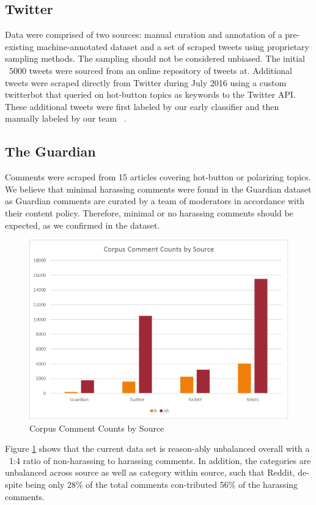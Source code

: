 \documentclass[11pt,a4paper]{article}
\begin{document}
\subsection{Twitter}
Data were comprised of two sources: manual curation
and annotation of a pre-existing machine-annotated
dataset and a set of scraped tweets using
proprietary sampling methods. The sampling
should not be considered unbiased. The initial
~5000 tweets were sourced from an online repository
of tweets at. Additional tweets were scraped
directly from Twitter during July 2016 using a custom
twitterbot that queried on hot-button topics as
keywords to the Twitter API. These additional
tweets were first labeled by our early classifier and
then manually labeled by our team ~\cite{Hart:2016}.

\subsection{The Guardian}
Comments were scraped from 15 articles covering
hot-button or polarizing topics. We believe that
minimal harassing comments were found in the
Guardian dataset as Guardian comments are curated
by a team of moderators in accordance with
their content policy. Therefore, minimal or no harassing
comments should be expected, as we confirmed
in the dataset.

\begin{figure}
  \includegraphics[width=\linewidth]{figure1_corpus_counts_by_source.png}
  \caption{Corpus Comment Counts by Source}
  \label{fig:corpus}
\end{figure}

Figure \ref{fig:corpus} shows that the current data set is reason-ably unbalanced overall with a ~1:4 ratio of non-harassing to harassing comments. In addition, the categories are unbalanced across source as well as category within source, such that Reddit, de-spite being only 28\% of the total comments con-tributed 56\% of the harassing comments.
\end{document}
